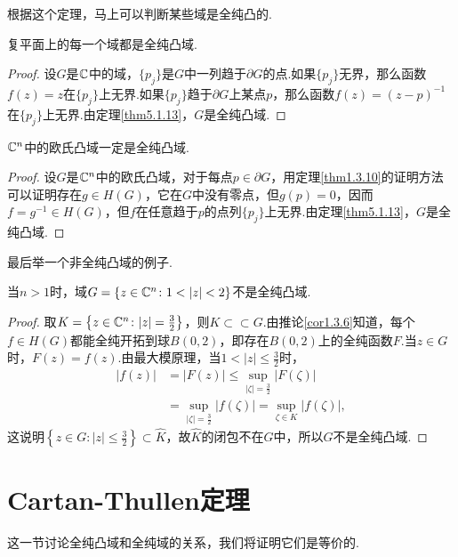 根据这个定理，马上可以判断某些域是全纯凸的.
\begin{theorem}\label{thm5.1.14}
	复平面上的每一个域都是全纯凸域.
\end{theorem}
\begin{proof}
	设$G$是$\mathbb C$中的域，$\{p_j\}$是$G$中一列趋于$\partial G$的点.如果$\{p_j\}$无界，那么函数$f(z)=z$在$\{p_j\}$上无界.如果$\{p_j\}$趋于$\partial G$上某点$p$，那么函数$f(z)=(z-p)^{-1}$在$\{p_j\}$上无界.由定理\ref{thm5.1.13}，$G$是全纯凸域.
\end{proof}
\begin{prop}\label{prop5.1.15}
	$\mathbb C^n$中的欧氏凸域一定是全纯凸域.
\end{prop}
\begin{proof}
	设$G$是$\mathbb C^n$中的欧氏凸域，对于每点$p\in\partial G$，用定理\ref{thm1.3.10}的证明方法可以证明存在$g\in H(G)$，它在$G$中没有零点，但$g(p)=0$，因而$f=g^{-1}\in H(G)$，但$f$在任意趋于$p$的点列$\{p_j\}$上无界.由定理\ref{thm5.1.13}，$G$是全纯凸域.
\end{proof}
最后举一个非全纯凸域的例子.
\begin{example}\label{exa5.1.16}
	当$n>1$时，域$G=\{z\in\MC^n\colon 1<|z|<2\}$不是全纯凸域.
\end{example}
\begin{proof}
	取$K=\left\{z\in\mathbb C^n\colon |z|=\frac32\right\}$，则$K\subset\subset G$.由推论\ref{cor1.3.6}知道，每个$f\in H(G)$都能全纯开拓到球$B(0,2)$，即存在$B(0,2)$上的全纯函数$F$.当$z\in G$时，$F(z)=f(z)$.由最大模原理，当$1<|z|\le\frac32$时，
	\begin{align*}
		|f(z)|
		&=|F(z)|\le\sup_{|\zeta|=\frac32}|F(\zeta)|\\
		&=\sup_{|\zeta|=\frac32}|f(\zeta)|=\sup_{\zeta\in K}|f(\zeta)|,
	\end{align*}
这说明$\left\{z\in G\colon |z|\le\frac32\right\}\subset\widehat{K}$，故$\widehat{K}$的闭包不在$G$中，所以$G$不是全纯凸域.
\end{proof}
\section{Cartan-Thullen定理\label{sec5.2}}
这一节讨论全纯凸域和全纯域的关系，我们将证明它们是等价的.
